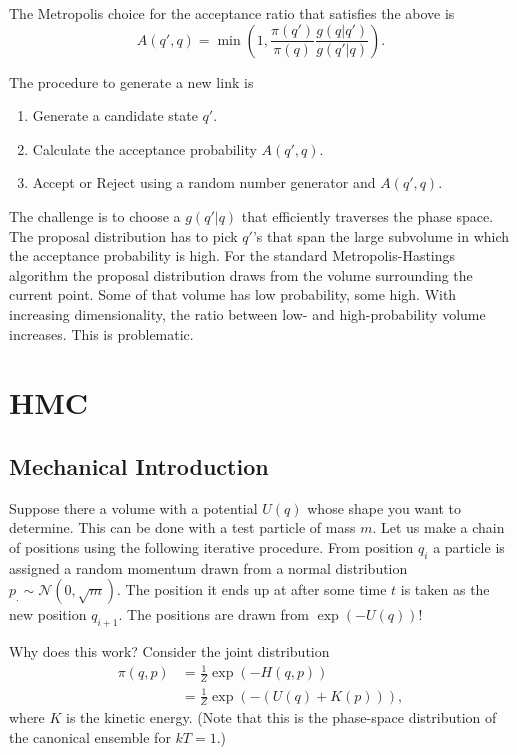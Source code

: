 \documentclass[11pt, oneside]{article}   	%
\begin{document}
The Metropolis choice for the acceptance ratio that satisfies the above is
\begin{equation}
A(q',q) = \min{\left(1, \frac{\pi(q')}{\pi(q)} \frac{g(q|q')}{g(q'|q)} \right)}.
\end{equation}

The procedure to generate a new link is
\begin{enumerate}
\item Generate a candidate state $q'$.
\item Calculate the acceptance probability $A(q',q)$.
\item Accept or Reject using a random number generator and $A(q',q)$.
\end{enumerate}

The challenge is to choose a $g(q'|q)$ that efficiently traverses the phase space. 
The proposal distribution has to pick $q'$'s that span the large subvolume in
which the acceptance probability is high.  For the standard Metropolis-Hastings
algorithm the proposal distribution
draws from the volume surrounding the current point.  Some of that volume
has low probability, some high.  With increasing dimensionality, the ratio between low-
and high-probability volume increases.
This is problematic.

\section{HMC}
\subsection{Mechanical Introduction}
Suppose there a volume with a potential $U(q)$ whose shape you want to determine.  This can be done 
with a test particle of mass $m$.  Let us make a chain of positions using the following iterative procedure.
From position $q_i$  a particle is assigned a random momentum
drawn from a normal distribution $p_. \sim \mathcal{N}(0, \sqrt{m})$.  The position it ends up
at after some time $t$ is taken as the new position $q_{i+1}$.
The positions are drawn from $\exp{\left(-U(q)\right)}$!

Why does this work? 
Consider the joint distribution
\begin{align}
\pi(q,p) & = \frac{1}{Z} \exp{\left(-H(q,p)\right)}\\
& = \frac{1}{Z} \exp{\left(-(U(q)+K(p))\right)},
\end{align}
where $K$ is the kinetic energy.  (Note that this is the phase-space distribution of the canonical ensemble for $kT=1$.)
\end{document}

